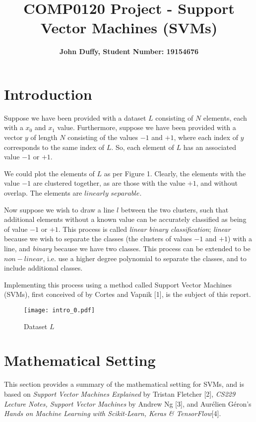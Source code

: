 \documentclass[10pt, a4paper,reqno]{amsart}
\title{COMP0120 Project - Support Vector Machines (SVM\MakeLowercase{s})}
\author{\textbf{John Duffy, Student Number: 19154676}}
\begin{document}
\maketitle

\section{Introduction}

Suppose we have been provided with a dataset $L$ consisting of $N$ elements, each with a $x_0$ and $x_1$ value. Furthermore, suppose we have been provided with a vector $y$ of length $N$ consisting of the values $-1$ and $+1$, where each index of $y$ corresponds to the same index of $L$. So, each element of $L$ has an associated value $-1$ or $+1$.

We could plot the elements of $L$ as per Figure 1. Clearly, the elements with the value $-1$ are clustered together, as are those with the value $+1$, and without overlap. The elements are $linearly$  $separable$.

Now suppose we wish to draw a line $l$ between the two clusters, such that additional elements without a known value can be accurately classified as being of value $-1$ or $+1$. This process is called \emph{linear binary classification}; \emph{linear} because we wish to separate the classes (the clusters of values $-1$ and $+1$) with a line, and \emph{binary} because we have two classes. This process can be extended to be $non-linear$, i.e. use a higher degree polynomial to separate the classes, and to include additional classes.  

Implementing this process using a method called Support Vector Machines (SVMs), first conceived of by Cortes and Vapnik [1], is the subject of this report.

\begin{figure}
	\centering	
	\texttt{[image: intro\_0.pdf]}
	\caption{Dataset $L$}
\end{figure}

\section{Mathematical Setting}

This section provides a summary of the mathematical setting for SVMs, and is based on \emph{Support Vector Machines Explained} by Tristan Fletcher [2], \emph{CS229 Lecture Notes, Support Vector Machines} by Andrew Ng [3], and Aur\'{e}lien G\'{e}ron's \emph{Hands on Machine Learning with Scikit-Learn, Keras \& TensorFlow}[4].
\end{document}

